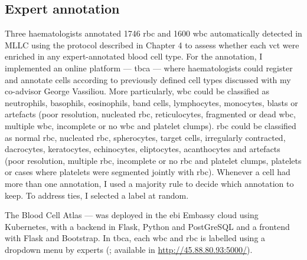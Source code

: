 \begin{figure}[!ht]
    \label{fig:rbc-anaemia-classification-examples}
\end{figure}

\begin{figure}[!ht]
    \label{fig:wbc-anaemia-classification-examples}
\end{figure}

\subsection{Expert annotation}

Three haematologists annotated 1746 \ac{rbc} and 1600 \ac{wbc} automatically detected in MLLC using the protocol described in Chapter 4 to assess whether each \ac{vct} were enriched in any expert-annotated blood cell type. For the annotation, I implemented an online platform --- \ac{tbca} --- where haematologists could register and annotate cells according to previously defined cell types discussed with my co-advisor George Vassiliou. More particularly, \ac{wbc} could be classified as neutrophils, basophils, eosinophils, band cells, lymphocytes, monocytes, blasts or artefacts (poor resolution, nucleated \ac{rbc}, reticulocytes, fragmented or dead \ac{wbc}, multiple \ac{wbc}, incomplete or no \ac{wbc} and platelet clumps). \Ac{rbc} could be classified as normal \ac{rbc}, nucleated \ac{rbc}, spherocytes, target cells, irregularly contracted, dacrocytes, keratocytes, echinocytes, eliptocytes, acanthocytes and artefacts (poor resolution, multiple \ac{rbc}, incomplete or no \ac{rbc} and platelet clumps, platelets or cases where platelets were segmented jointly with \ac{rbc}). Whenever a cell had more than one annotation, I used a majority rule to decide which annotation to keep. To address ties, I selected a label at random.

The Blood Cell Atlas --- was deployed in the \ac{ebi} Embassy cloud using Kubernetes, with a backend in Flask, Python and PostGreSQL and a frontend with Flask and Bootstrap. In \ac{tbca}, each \ac{wbc} and \ac{rbc} is labelled using a dropdown menu by experts (; available in \url{http://45.88.80.93:5000/}).

